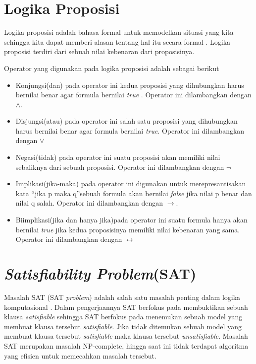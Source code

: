 \section{Logika Proposisi}

Logika proposisi adalah bahasa formal untuk memodelkan situasi yang kita sehingga kita dapat memberi alasan tentang hal itu secara formal \cite{huth2004logic}. Logika proposisi terdiri dari sebuah nilai kebenaran dari proposisinya.

Operator yang digunakan pada logika proposisi adalah sebagai berikut

\begin{itemize}
	\item Konjungsi(dan) pada operator ini kedua proposisi yang dihubungkan harus bernilai benar agar formula bernilai \textit{true}
	. Operator ini dilambangkan dengan $\wedge$.
	\item Disjungsi(atau) pada operator ini salah satu proposisi yang dihubungkan harus bernilai benar agar formula bernilai \textit{true}. Operator ini dilambangkan dengan $\lor$ 
	\item Negasi(tidak) pada operator ini suatu proposisi akan memiliki nilai sebaliknya dari sebuah proposisi. Operator ini dilambangkan dengan $\neg$
	\item Implikasi(jika-maka) pada operator ini digunakan untuk merepresantisakan kata \textquotedblleft jika p maka q\textquotedblright sebuah formula akan bernilai \textit{false} jika nilai p benar dan nilai q salah. Operator ini dilambangkan dengan $\to$. 
	\item Biimplikasi(jika dan hanya jika)pada operator ini suatu formula hanya akan bernilai \textit{true} jika kedua proposisinya memiliki nilai kebenaran yang sama. Operator ini dilambangkan dengan $\leftrightarrow$
	
\end{itemize}

\section{\textit{Satisfiability Problem}(SAT)}

Masalah SAT (SAT \textit{problem}) adalah salah satu masalah penting dalam logika komputasional \cite{huth2004logic}. Dalam pengerjaannya SAT berfokus pada membuktikan sebuah klausa \textit{satisfiable} sehingga SAT berfokus pada menemukan sebuah model yang membuat klausa tersebut \textit{satisfiable}. Jika tidak ditemukan sebuah model yang membuat klausa tersebut \textit{satisfiable} maka klausa tersebut \textit{unsatisfiable}. Masalah SAT merupakan masalah NP-complete, hingga saat ini tidak
terdapat algoritma yang efisien untuk memecahkan masalah tersebut. 

